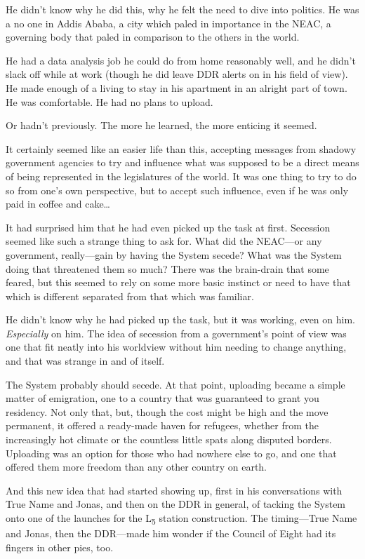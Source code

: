 He didn't know why he did this, why he felt the need to dive into politics. He was a no one in Addis Ababa, a city which paled in importance in the NEAC, a governing body that paled in comparison to the others in the world.

He had a data analysis job he could do from home reasonably well, and he didn't slack off while at work (though he did leave DDR alerts on in his field of view). He made enough of a living to stay in his apartment in an alright part of town. He was comfortable. He had no plans to upload.

Or hadn't previously. The more he learned, the more enticing it seemed.

It certainly seemed like an easier life than this, accepting messages from shadowy government agencies to try and influence what was supposed to be a direct means of being represented in the legislatures of the world. It was one thing to try to do so from one's own perspective, but to accept such influence, even if he was only paid in coffee and cake\ldots{}

It had surprised him that he had even picked up the task at first. Secession seemed like such a strange thing to ask for. What did the NEAC---or any government, really---gain by having the System secede? What was the System doing that threatened them so much? There was the brain-drain that some feared, but this seemed to rely on some more basic instinct or need to have that which is different separated from that which was familiar.

He didn't know why he had picked up the task, but it was working, even on him. \emph{Especially} on him. The idea of secession from a government's point of view was one that fit neatly into his worldview without him needing to change anything, and that was strange in and of itself.

The System probably should secede. At that point, uploading became a simple matter of emigration, one to a country that was guaranteed to grant you residency. Not only that, but, though the cost might be high and the move permanent, it offered a ready-made haven for refugees, whether from the increasingly hot climate or the countless little spats along disputed borders. Uploading was an option for those who had nowhere else to go, and one that offered them more freedom than any other country on earth.

And this new idea that had started showing up, first in his conversations with True Name and Jonas, and then on the DDR in general, of tacking the System onto one of the launches for the L\textsubscript{5} station construction. The timing---True Name and Jonas, then the DDR---made him wonder if the Council of Eight had its fingers in other pies, too.

